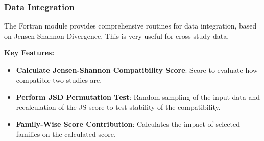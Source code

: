 \subsubsection{Data Integration}
The Fortran module provides comprehensive routines for data integration, based on Jensen-Shannon Divergence. This is very useful for cross-study data.

\textbf{Key Features:}
\begin{itemize}
    \item \textbf{Calculate Jensen-Shannon Compatibility Score}: Score to evaluate how compatible two studies are.
    \item \textbf{Perform JSD Permutation Test}: Random sampling of the input data and recalculation of the JS score to test stability of the compatibility.
    \item \textbf{Family-Wise Score Contribution}: Calculates the impact of selected families on the calculated score.
\end{itemize}

